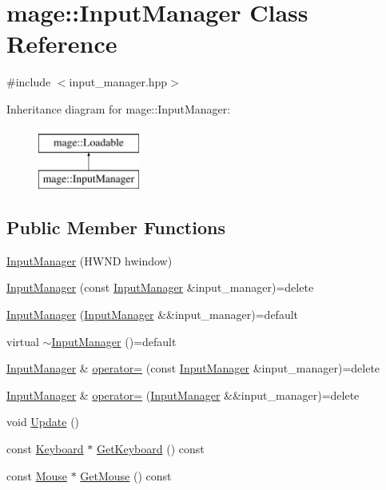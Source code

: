 \hypertarget{classmage_1_1_input_manager}{}\section{mage\+:\+:Input\+Manager Class Reference}
\label{classmage_1_1_input_manager}


{\ttfamily \#include $<$input\+\_\+manager.\+hpp$>$}

Inheritance diagram for mage\+:\+:Input\+Manager\+:\begin{figure}[H]
\begin{center}
\leavevmode
\includegraphics[height=2.000000cm]{classmage_1_1_input_manager}
\end{center}
\end{figure}
\subsection*{Public Member Functions}
\begin{DoxyCompactItemize}
\item 
\hyperlink{classmage_1_1_input_manager_afc28df27a0251c242113a9761c007534}{Input\+Manager} (H\+W\+ND hwindow)
\item 
\hyperlink{classmage_1_1_input_manager_a68503617f418bf270dc39bb18019b46d}{Input\+Manager} (const \hyperlink{classmage_1_1_input_manager}{Input\+Manager} \&input\+\_\+manager)=delete
\item 
\hyperlink{classmage_1_1_input_manager_a93de208333f18b4c61ec72d0a28d0d51}{Input\+Manager} (\hyperlink{classmage_1_1_input_manager}{Input\+Manager} \&\&input\+\_\+manager)=default
\item 
virtual \hyperlink{classmage_1_1_input_manager_a6e6e612b3b2bacb4ee5d0fcfde35a275}{$\sim$\+Input\+Manager} ()=default
\item 
\hyperlink{classmage_1_1_input_manager}{Input\+Manager} \& \hyperlink{classmage_1_1_input_manager_ad9caa8b7e99a69b774887f342bd5dda0}{operator=} (const \hyperlink{classmage_1_1_input_manager}{Input\+Manager} \&input\+\_\+manager)=delete
\item 
\hyperlink{classmage_1_1_input_manager}{Input\+Manager} \& \hyperlink{classmage_1_1_input_manager_ae7c1c4d2d55d86cbc88a5fbc2f1279a8}{operator=} (\hyperlink{classmage_1_1_input_manager}{Input\+Manager} \&\&input\+\_\+manager)=delete
\item 
void \hyperlink{classmage_1_1_input_manager_a5e516969ff4ae9876b98c28f48f93726}{Update} ()
\item 
const \hyperlink{classmage_1_1_keyboard}{Keyboard} $\ast$ \hyperlink{classmage_1_1_input_manager_a5b72139e30d1f3da6cda50f2989c1350}{Get\+Keyboard} () const
\item 
const \hyperlink{classmage_1_1_mouse}{Mouse} $\ast$ \hyperlink{classmage_1_1_input_manager_ad268916e07f44e40bf267efa0e673186}{Get\+Mouse} () const
\end{DoxyCompactItemize}
